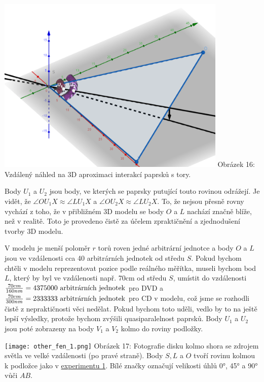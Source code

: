 \documentclass[titlepage]{article}
\begin{document}
 \label{image:16}
\begin{center}
    \includegraphics[width = 11cm]{3D_2.png}
    \linebreak
    Obrázek 16: Vzdálený náhled na 3D aproximaci interakcí paprsků s tory.
\end{center}

\pagebreak

Body $U_{1}$ a $U_{2}$ jsou body, ve kterých se paprsky putující touto rovinou odrážejí. Je vidět, že $\angle OU_1X \approx \angle LU_1X$ a $\angle OU_2X \approx \angle LU_2X$. To, že nejsou přesně rovny vychází z toho, že v přibližném 3D modelu se body $O$ a $L$ nachází značně blíže, než v realitě. 
Toto je provedeno čistě za účelem zpraktičnění a zjednodušení tvorby 3D modelu.

V modelu je menší poloměr $r$ torů roven jedné arbitrární jednotce a body $O$ a $L$ jsou ve vzdálenosti cca 40 arbitrárních jednotek od středu $S$.
Pokud bychom chtěli v modelu reprezentovat pozice podle reálného měřítka, museli bychom bod $L$, který by byl ve vzdálenosti např. 70cm od středu $S$, umístit do vzdálenosti 
$\frac{70cm}{160nm}=4375000 \textnormal{ arbitrárních jednotek}$ pro DVD a $\frac{70cm}{300nm} = 2333333 \textnormal{ arbitrárních jednotek}$ pro CD v modelu, což jsme se rozhodli čistě z nepraktičnosti věci nedělat.
Pokud bychom toto uděli, vedlo by to na ještě lepší výsledky, protože bychom zvýšili quasiparalelnost paprsků.
Body $U_1$ a $U_2$ jsou poté zobrazeny na body $V_1$ a $V_2$ kolmo do roviny podložky.

 \label{image:17}
\begin{center}
    \texttt{[image: other\_fen\_1.png]}
    \linebreak
    Obrázek 17: Fotografie disku kolmo shora se zdrojem světla ve velké vzdálenosti (po pravé straně). Body $S, L$ a $O$ tvoří rovinu kolmou k podložce jako v \hyperref[exp:1]{experimentu 1}. Bílé značky označují velikosti úhlů 0°, 45° a 90° vůči $AB$.
\end{center}
\end{document}
